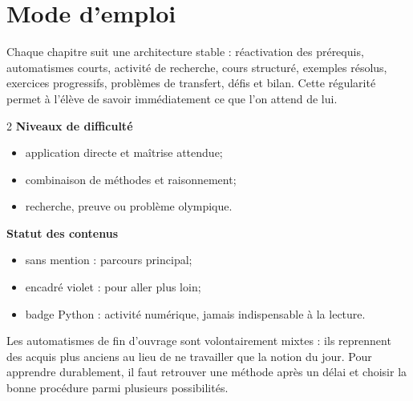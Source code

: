 \chapter*{Mode d'emploi}

Chaque chapitre suit une architecture stable : réactivation des prérequis,
automatismes courts, activité de recherche, cours structuré, exemples résolus,
exercices progressifs, problèmes de transfert, défis et bilan. Cette régularité
permet à l'élève de savoir immédiatement ce que l'on attend de lui.

\begin{multicols}{2}
\textbf{Niveaux de difficulté}
\begin{itemize}
  \item {} application directe et maîtrise attendue;
  \item {} combinaison de méthodes et raisonnement;
  \item {} recherche, preuve ou problème olympique.
\end{itemize}

\columnbreak
\textbf{Statut des contenus}
\begin{itemize}
  \item sans mention : parcours principal;
  \item encadré violet : pour aller plus loin;
  \item badge Python : activité numérique, jamais indispensable à la lecture.
\end{itemize}
\end{multicols}

Les automatismes de fin d'ouvrage sont volontairement mixtes : ils reprennent
des acquis plus anciens au lieu de ne travailler que la notion du jour. Pour
apprendre durablement, il faut retrouver une méthode après un délai et choisir
la bonne procédure parmi plusieurs possibilités.
